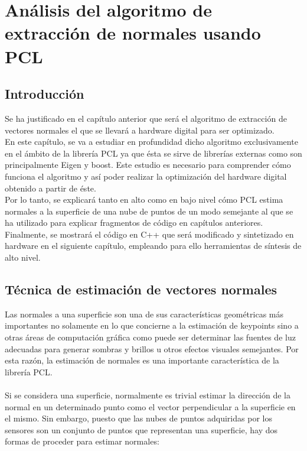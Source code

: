 \chapter{Análisis del algoritmo de extracción de normales usando PCL}

\section{Introducción}
Se ha justificado en el capítulo anterior que será el algoritmo de extracción de vectores normales el que se llevará a hardware digital para ser optimizado. 
\\
En este capítulo, se va a estudiar en profundidad dicho algoritmo exclusivamente en el ámbito de la librería PCL ya que ésta se sirve de librerías externas como son principalmente Eigen y boost. Este estudio es necesario para comprender cómo funciona el algoritmo y así poder realizar la optimización del hardware digital obtenido a partir de éste.
\\
Por lo tanto, se explicará tanto en alto como en bajo nivel cómo PCL estima normales a la superficie de una nube de puntos de un modo semejante al que se ha utilizado para explicar fragmentos de código en capítulos anteriores. Finalmente, se mostrará el código en C++ que será modificado y sintetizado en hardware en el siguiente capítulo, empleando para ello herramientas de síntesis de alto nivel.


\section{Técnica de estimación de vectores normales}


Las normales a una superficie son una de sus características geométricas más importantes no solamente en lo que concierne a la estimación de keypoints sino a otras áreas de computación gráfica como puede ser determinar las fuentes de luz adecuadas para generar sombras y brillos u otros efectos visuales semejantes. Por esta razón, la estimación de normales es una importante característica de la librería PCL\cite{normal}.
\\
\\
Si se considera una superficie, normalmente es trivial estimar la dirección de la normal en un determinado punto como el vector perpendicular a la superficie en el mismo. Sin embargo, puesto que las nubes de puntos adquiridas por los sensores son un conjunto de puntos que representan una superficie, hay dos formas de proceder para estimar normales:

